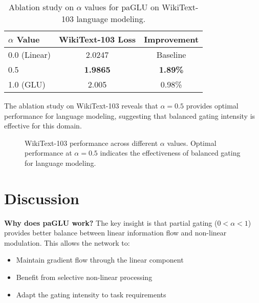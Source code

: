 \documentclass[11pt]{article}
\begin{document}
\begin{table}[ht]
\centering
\caption{Ablation study on $\alpha$ values for paGLU on WikiText-103 language modeling.}
\label{tab:ablation}
\begin{tabular}{lcc}
\toprule
$\alpha$ Value & WikiText-103 Loss & Improvement \\
\midrule
0.0 (Linear) & 2.0247 & Baseline \\
0.5 & \textbf{1.9865} & \textbf{1.89\%} \\
1.0 (GLU) & 2.005 & 0.98\% \\
\bottomrule
\end{tabular}
\end{table}

The ablation study on WikiText-103 reveals that $\alpha = 0.5$ provides optimal performance for language modeling, suggesting that balanced gating intensity is effective for this domain.

\begin{figure}[ht]
\centering
{}
\caption{WikiText-103 performance across different $\alpha$ values. Optimal performance at $\alpha = 0.5$ indicates the effectiveness of balanced gating for language modeling.}
\label{fig:alpha_ablation}
\end{figure}

\section{Discussion}
\label{sec:discussion}

\textbf{Why does paGLU work?} The key insight is that partial gating ($0 < \alpha < 1$) provides better balance between linear information flow and non-linear modulation. This allows the network to:
\begin{itemize}
    \item Maintain gradient flow through the linear component
    \item Benefit from selective non-linear processing
    \item Adapt the gating intensity to task requirements
\end{itemize}
\end{document}
